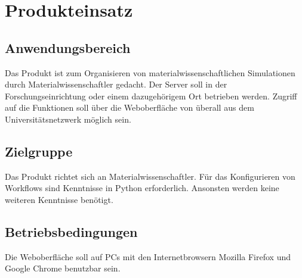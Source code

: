 \chapter{Produkteinsatz}
\section{Anwendungsbereich}
Das Produkt ist zum Organisieren von materialwissenschaftlichen Simulationen durch Materialwissenschaftler gedacht. 
Der Server soll in der Forschungseinrichtung oder einem dazugehörigem Ort betrieben werden.
Zugriff auf die Funktionen soll über die Weboberfläche von überall aus dem Universitätsnetzwerk möglich sein.

\section{Zielgruppe}
Das Produkt richtet sich an Materialwissenschaftler.
Für das Konfigurieren von Workflows sind Kenntnisse in \gls{Python} erforderlich. Ansonsten werden keine weiteren Kenntnisse benötigt.

\section{Betriebsbedingungen}
Die Weboberfläche soll auf PCs mit den Internetbrowsern Mozilla Firefox und Google Chrome benutzbar sein.

